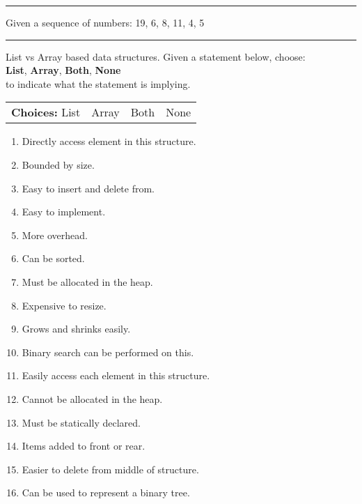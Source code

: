 \documentclass[12pt]{exam}
\newcommand{\seperate}{\begin{center}\noindent\rule{18cm}{0.75pt}\end{center}}
\begin{document}
\begin{questions}
    \seperate

    \question[15] Given a sequence of numbers: 19, 6, 8, 11, 4, 5

    \seperate


    \question[30] List vs Array based data structures. Given a statement below, choose:\\
    \textbf{List}, \textbf{Array}, \textbf{Both}, \textbf{None}\\
    to indicate what the statement is implying.

    \begin{tabular}{ c  c  c  c }
        \textbf{Choices:} List & Array & Both & None \\
    \end{tabular}

    \renewcommand{\theenumi}{\Alph{enumi}}
    \begin{enumerate}
        \item Directly access element in this structure.
        \item Bounded by size.
        \item Easy to insert and delete from.
        \item Easy to implement.
        \item More overhead.
        \item Can be sorted.
        \item Must be allocated in the heap.
        \item Expensive to resize.
        \item Grows and shrinks easily.
        \item Binary search can be performed on this.
        \item Easily access each element in this structure.
        \item Cannot be allocated in the heap.
        \item Must be statically declared.
        \item Items added to front or rear.
        \item Easier to delete from middle of structure.
        \item Can be used to represent a binary tree.
    \end{enumerate}



\end{questions}
\end{document}
